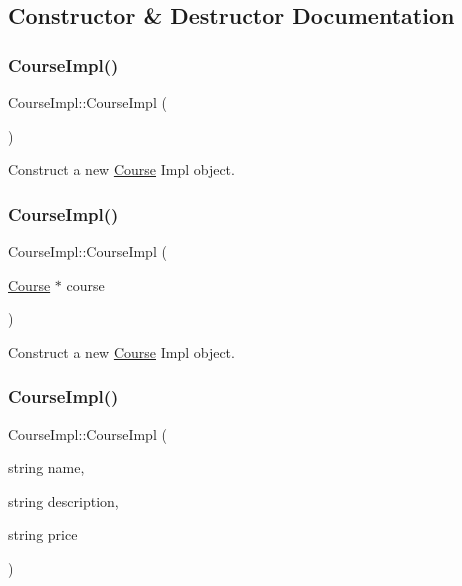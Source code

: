 \subsection{Constructor \& Destructor Documentation}
\mbox{\label{classCourseImpl_a1f90c3b1232d808f1adfd22700ae0c36}} 
\subsubsection{\texorpdfstring{Course\+Impl()}{CourseImpl()}\hspace{0.1cm}{\footnotesize\ttfamily [1/3]}}
{\footnotesize\ttfamily Course\+Impl\+::\+Course\+Impl (\begin{DoxyParamCaption}{ }\end{DoxyParamCaption})}



Construct a new \hyperlink{classCourse}{Course} Impl object. 

\mbox{\label{classCourseImpl_a2d4d21ad889d02d6ad25827fa7d87e59}} 
\subsubsection{\texorpdfstring{Course\+Impl()}{CourseImpl()}\hspace{0.1cm}{\footnotesize\ttfamily [2/3]}}
{\footnotesize\ttfamily Course\+Impl\+::\+Course\+Impl (\begin{DoxyParamCaption}\item[{\hyperlink{classCourse}{Course} $\ast$}]{course }\end{DoxyParamCaption})}



Construct a new \hyperlink{classCourse}{Course} Impl object. 

\mbox{\label{classCourseImpl_ad762665b174957dbdecd37945b52e41d}} 
\subsubsection{\texorpdfstring{Course\+Impl()}{CourseImpl()}\hspace{0.1cm}{\footnotesize\ttfamily [3/3]}}
{\footnotesize\ttfamily Course\+Impl\+::\+Course\+Impl (\begin{DoxyParamCaption}\item[{string}]{name,  }\item[{string}]{description,  }\item[{string}]{price }\end{DoxyParamCaption})}



